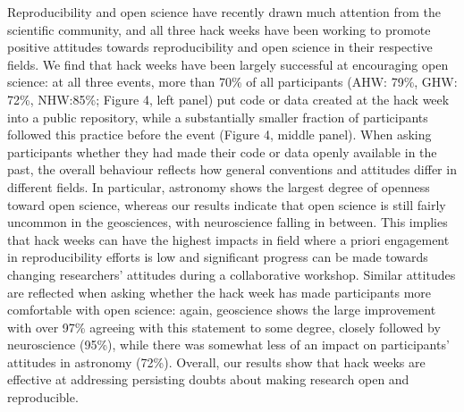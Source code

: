 Reproducibility and open science have recently drawn much attention from the scientific community, and all three hack weeks have been working to promote positive attitudes towards reproducibility and open science in their respective fields.
We find that hack weeks have been largely successful at encouraging open science: at all three events, more than 70\% of all participants (AHW: 79\%, GHW: 72\%, NHW:85\%; Figure 4, left panel) put code or data created at the hack week into a public repository, while a substantially smaller fraction of participants followed this practice before the event (Figure 4, middle panel).
When asking participants whether they had made their code or data openly available in the past, the overall behaviour reflects how general conventions and attitudes differ in different fields.
In particular, astronomy shows the largest degree of openness toward open science, whereas our results indicate that open science is still fairly uncommon in the geosciences, with neuroscience falling in between.
This implies that hack weeks can have the highest impacts in field where a priori engagement in reproducibility efforts is low and significant progress can be made towards changing researchers' attitudes during a collaborative workshop.
Similar attitudes are reflected when asking whether the hack week has made participants more comfortable with open science: again, geoscience shows the large improvement with over 97\% agreeing with this statement to some degree, closely followed by neuroscience (95\%), while there was somewhat less of an impact on participants' attitudes in astronomy (72\%).
Overall, our results show that hack weeks are effective at addressing persisting doubts about making research open and reproducible.

